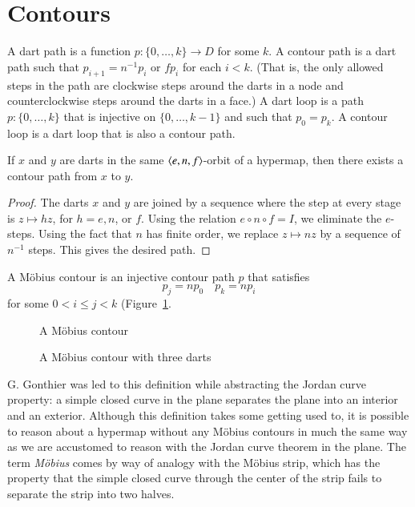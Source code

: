 \section{Contours}

\begin{definition}  A dart path is a function $p:\{0,\ldots,k\}\to D$
for some $k$.  A contour path is a dart path such that $p_{i+1} =
n^{-1} p_i$ or $f p_i$ for each $i<k$.  (That is, the only allowed
steps in the path are clockwise steps around the darts in a node and
counterclockwise steps around the darts in a face.)  A dart loop is
a path $p:\{0,\ldots,k\}$ that is injective on $\{0,\ldots,k-1\}$
and such that $p_0 = p_k$.  A contour loop is a dart loop that is
also a contour path.
\end{definition}

\begin{lemma}\label{lemma:connect-contour}  If $x$ and $y$ are darts
in the same $\langle e,n,f\rangle$-orbit of a hypermap, then there exists
a contour path from $x$ to $y$.
\end{lemma}

\begin{proof} 
The darts
$x$ and $y$ are joined by a sequence where the step at every stage
is $z\mapsto h z$, for $h=e,n$, or $f$.  Using the relation $e\circ
n\circ f = I$, we eliminate the $e$-steps. Using the fact that $n$
has finite order, we replace $z \mapsto n z$ by a sequence
of $n^{-1}$ steps.  This gives the desired path.
\end{proof}

\begin{definition} A M\"obius contour is an
injective contour path $p$ that satisfies
    \begin{equation}
    \label{eqn:mobius}
    p_j = n p_0\quad p_k = n p_i
    \end{equation}
for some $0 < i\le j< k$ (Figure~\ref{fig:mobius}.
\end{definition}

\begin{figure}[htb]
  \centering
  \caption{A M\"obius contour}
  \label{fig:mobius}
\end{figure}

\begin{figure}[htb]
  \centering
  \caption{A M\"obius contour with three darts}
  \label{fig:3m}
\end{figure}


\begin{remark}
 G. Gonthier was led to
this definition while abstracting the Jordan curve property: a
simple closed curve in the plane separates the plane into an
interior and an exterior.  Although this definition takes some getting used to,
it is possible to reason about a hypermap without any M\"obius contours in
much the same way as we are accustomed to reason with the Jordan curve theorem
in the plane.
The term {\it M\"obius} comes by way of
analogy with the M\"obius strip, which has the property that the
simple closed curve through the center of the strip fails to
separate the strip into two halves.
\end{remark}



